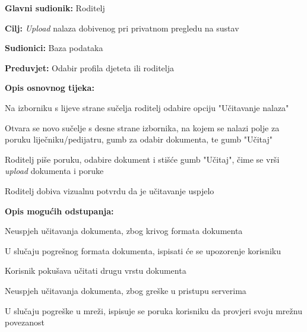 					\noindent {}
					\begin{packed_item}
						
						\item \textbf{Glavni sudionik: }Roditelj
						\item  \textbf{Cilj:} \textit{Upload} nalaza dobivenog pri privatnom pregledu na sustav
						\item  \textbf{Sudionici:} Baza podataka
						\item  \textbf{Preduvjet:} Odabir profila djeteta ili roditelja
						\item  \textbf{Opis osnovnog tijeka:}
						
						\item[] \begin{packed_enum}
							
							\item Na izborniku s lijeve strane sučelja roditelj odabire opciju "Učitavanje nalaza"
							\item Otvara se novo sučelje s desne strane izbornika, na kojem se nalazi polje za poruku liječniku/pedijatru, gumb za odabir dokumenta, te gumb "Učitaj"
							\item Roditelj piše poruku, odabire dokument i stišće gumb "Učitaj", čime se vrši \textit{upload} dokumenta i poruke
							\item Roditelj dobiva vizualnu potvrdu da je učitavanje uspjelo
						\end{packed_enum}
						
						\item  \textbf{Opis mogućih odstupanja:}
						
						\item[] \begin{packed_item}
							\item[3.a] Neuspjeh učitavanja dokumenta, zbog krivog formata dokumenta
							\item[] \begin{packed_enum}
								\item U slučaju pogrešnog formata dokumenta, ispisati će se upozorenje korisniku
								\item Korisnik pokušava učitati drugu vrstu dokumenta
							\end{packed_enum}
							\item[3.b] Neuspjeh učitavanja dokumenta, zbog greške u pristupu serverima
							\item[] \begin{packed_enum}
								\item U slučaju pogreške u mreži, ispisuje se poruka korisniku da provjeri svoju mrežnu povezanost
							\end{packed_enum}
							
						\end{packed_item}
					\end{packed_item}
					
